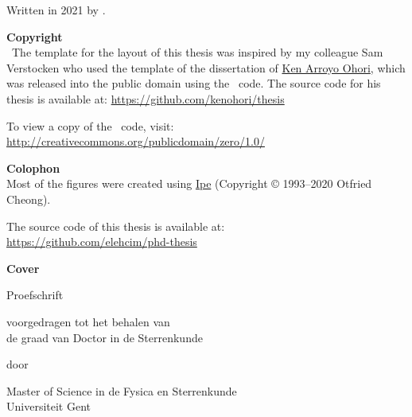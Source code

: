 
% 

\maketitle

\clearpage
\thispagestyle{empty}
\null%
\label{thesis:colophon}
\vfill
{}
Written in 2021 by
{\makeatletter{\@author}%
\makeatother}.

\textbf{Copyright}\\
\cczero\ The template for the layout of this thesis was inspired by my colleague Sam Verstocken who used the template of the dissertation of \href{ken.mx}{Ken Arroyo Ohori},
which was released into the public domain using the \cczero\ code. The source code for his thesis is available at: \url{https://github.com/kenohori/thesis}

To view a copy of the \cczero\ code, visit: \\
\url{http://creativecommons.org/publicdomain/zero/1.0/}


\textbf{Colophon} \\
Most of the figures were created using \href{http://ipe.otfried.org/}{Ipe} (Copyright © 1993–2020 Otfried Cheong).

The source code of this thesis is available at: \\
\url{https://github.com/elehcim/phd-thesis}

\textbf{Cover} \\

\begin{titlepage}
\null%
\label{thesis:title}
\vspace{3em}%
\begin{center}

\vspace*{4\baselineskip}

\makeatletter
{\huge\@title}
\makeatother
\vfill

{\Large Proefschrift}

\medskip

{voorgedragen tot het behalen van \\
de graad van
Doctor in de Sterrenkunde}


\medskip

door

\medskip

\makeatletter
{\Large \@author}
\makeatother

\medskip

Master of Science in de Fysica en  Sterrenkunde \\
Universiteit Gent

\end{center}
\end{titlepage}

